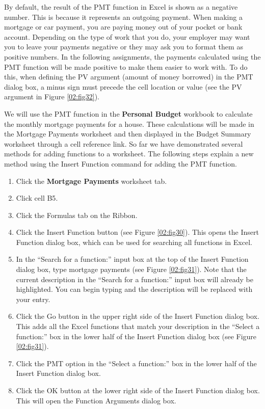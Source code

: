 By default, the result of the PMT function in Excel is shown as a negative number. This is because it represents an outgoing payment. When making a mortgage or car payment, you are paying money out of your pocket or bank account. Depending on the type of work that you do, your employer may want you to leave your payments negative or they may ask you to format them as positive numbers. In the following assignments, the payments calculated using the PMT function will be made positive to make them easier to work with. To do this, when defining the PV argument (amount of money borrowed) in the PMT dialog box, a minus sign must precede the cell location or value (see the PV argument in Figure \ref{02:fig32}).

We will use the PMT function in the \textbf{Personal Budget} workbook to calculate the monthly mortgage payments for a house. These calculations will be made in the Mortgage Payments worksheet and then displayed in the Budget Summary worksheet through a cell reference link. So far we have demonstrated several methods for adding functions to a worksheet. The following steps explain a new method using the Insert Function command for adding the PMT function.

\begin{enumerate}
	\item Click the \textbf{Mortgage Payments} worksheet tab.
	\item Click cell \textsf{B5}.
	\item Click the Formulas tab on the Ribbon.
	\item Click the Insert Function button (see Figure \ref{02:fig30}). This opens the Insert Function dialog box, which can be used for searching all functions in Excel.
	\item In the ``Search for a function:'' input box at the top of the Insert Function dialog box, type mortgage payments (see Figure \ref{02:fig31}). Note that the current description in the ``Search for a function:'' input box will already be highlighted. You can begin typing and the description will be replaced with your entry.
	\item Click the Go button in the upper right side of the Insert Function dialog box. This adds all the Excel functions that match your description in the ``Select a function:'' box in the lower half of the Insert Function dialog box (see Figure \ref{02:fig31}).
	\item Click the PMT option in the ``Select a function:'' box in the lower half of the Insert Function dialog box.
	\item Click the OK button at the lower right side of the Insert Function dialog box. This will open the Function Arguments dialog box.
\end{enumerate}

